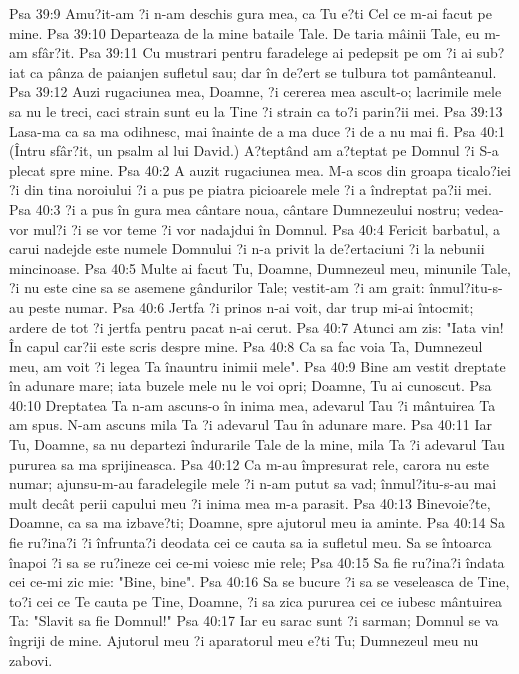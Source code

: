 Psa 39:9  Amu?it-am ?i n-am deschis gura mea, ca Tu e?ti Cel ce m-ai facut pe mine.
Psa 39:10  Departeaza de la mine bataile Tale. De taria mâinii Tale, eu m-am sfâr?it.
Psa 39:11  Cu mustrari pentru faradelege ai pedepsit pe om ?i ai sub?iat ca pânza de paianjen sufletul sau; dar în de?ert se tulbura tot pamânteanul.
Psa 39:12  Auzi rugaciunea mea, Doamne, ?i cererea mea ascult-o; lacrimile mele sa nu le treci, caci strain sunt eu la Tine ?i strain ca to?i parin?ii mei.
Psa 39:13  Lasa-ma ca sa ma odihnesc, mai înainte de a ma duce ?i de a nu mai fi.
Psa 40:1  (Întru sfâr?it, un psalm al lui David.) A?teptând am a?teptat pe Domnul ?i S-a plecat spre mine.
Psa 40:2  A auzit rugaciunea mea. M-a scos din groapa ticalo?iei ?i din tina noroiului ?i a pus pe piatra picioarele mele ?i a îndreptat pa?ii mei.
Psa 40:3  ?i a pus în gura mea cântare noua, cântare Dumnezeului nostru; vedea-vor mul?i ?i se vor teme ?i vor nadajdui în Domnul.
Psa 40:4  Fericit barbatul, a carui nadejde este numele Domnului ?i n-a privit la de?ertaciuni ?i la nebunii mincinoase.
Psa 40:5  Multe ai facut Tu, Doamne, Dumnezeul meu, minunile Tale, ?i nu este cine sa se asemene gândurilor Tale; vestit-am ?i am grait: înmul?itu-s-au peste numar.
Psa 40:6  Jertfa ?i prinos n-ai voit, dar trup mi-ai întocmit; ardere de tot ?i jertfa pentru pacat n-ai cerut.
Psa 40:7  Atunci am zis: "Iata vin! În capul car?ii este scris despre mine.
Psa 40:8  Ca sa fac voia Ta, Dumnezeul meu, am voit ?i legea Ta înauntru inimii mele".
Psa 40:9  Bine am vestit dreptate în adunare mare; iata buzele mele nu le voi opri; Doamne, Tu ai cunoscut.
Psa 40:10  Dreptatea Ta n-am ascuns-o în inima mea, adevarul Tau ?i mântuirea Ta am spus. N-am ascuns mila Ta ?i adevarul Tau în adunare mare.
Psa 40:11  Iar Tu, Doamne, sa nu departezi îndurarile Tale de la mine, mila Ta ?i adevarul Tau pururea sa ma sprijineasca.
Psa 40:12  Ca m-au împresurat rele, carora nu este numar; ajunsu-m-au faradelegile mele ?i n-am putut sa vad; înmul?itu-s-au mai mult decât perii capului meu ?i inima mea m-a parasit.
Psa 40:13  Binevoie?te, Doamne, ca sa ma izbave?ti; Doamne, spre ajutorul meu ia aminte.
Psa 40:14  Sa fie ru?ina?i ?i înfrunta?i deodata cei ce cauta sa ia sufletul meu. Sa se întoarca înapoi ?i sa se ru?ineze cei ce-mi voiesc mie rele;
Psa 40:15  Sa fie ru?ina?i îndata cei ce-mi zic mie: "Bine, bine".
Psa 40:16  Sa se bucure ?i sa se veseleasca de Tine, to?i cei ce Te cauta pe Tine, Doamne, ?i sa zica pururea cei ce iubesc mântuirea Ta: "Slavit sa fie Domnul!"
Psa 40:17  Iar eu sarac sunt ?i sarman; Domnul se va îngriji de mine. Ajutorul meu ?i aparatorul meu e?ti Tu; Dumnezeul meu nu zabovi.
